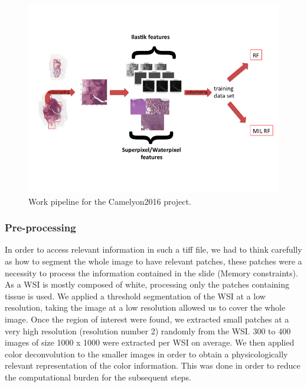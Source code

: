 \documentclass[a4paper,10pt]{article}
\begin{document}
\begin{figure}[!ht]
\centering
\includegraphics[width=\textwidth]{workflow.png}
\caption{Work pipeline for the Camelyon2016 project.}
\label{PipelineCam}
\end{figure}


\subsubsection*{Pre-processing}

In order to access relevant information in such a tiff file, we had to think carefully as how to segment the whole image to have relevant patches, these patches were a necessity to process the information contained in the slide (Memory constraints). As a WSI is mostly composed of white, processing only the patches containing tissue is used. We applied a threshold segmentation of the WSI at a low resolution, taking the image at a low resolution allowed us to cover the whole image. Once the region of interest were found, we extracted small patches at a very high resolution (resolution number 2) randomly from the WSI. 300 to 400 images of size 1000 x 1000 were extracted per WSI on average. We then applied color deconvolution \citep{deconvolution} to the smaller images in order to obtain a physicologically relevant representation
of the color information. This was done in order to reduce the
computational burden for the subsequent steps.
\end{document}
